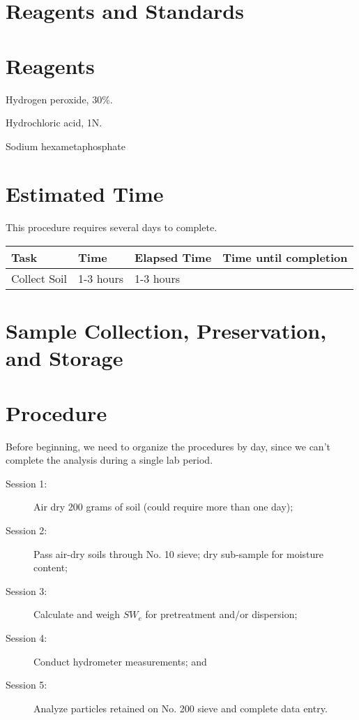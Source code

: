 \documentclass[12pt]{../SOP3_alpha}
\begin{document}
\section{Reagents and Standards}

\section{Reagents}
\begin{enumerate*}
	\item Hydrogen peroxide, 30\%.
	\item Hydrochloric acid, 1N.
	\item Sodium hexametaphosphate
\end{enumerate*}

\section{Estimated Time}

\NP This procedure requires several days to complete.

\begin{table}
\begin{tabular}{llll}\hline
Task          & Time          & Elapsed Time  & Time until completion \\ \hline\hline
Collect Soil  & 1-3 hours     & 1-3 hours     &         \\ \hline
\end{tabular}
\end{table}

\section{Sample Collection, Preservation, and Storage}



\section{Procedure}

\NP Before beginning, we need to organize the procedures by day, since we can't complete the analysis during a single lab period.

\begin{description}
	\item[Session 1:] Air dry 200 grams of soil (could require more than one day);
	\item[Session 2:] Pass air-dry soils through No. 10 sieve; dry sub-sample for moisture content; 
	\item[Session 3:] Calculate and weigh $SW_e$ for pretreatment and/or dispersion; 
	\item[Session 4:] Conduct hydrometer measurements; and
	\item[Session 5:] Analyze particles retained on No. 200 sieve and complete data entry.
\end{description}
\end{document}

